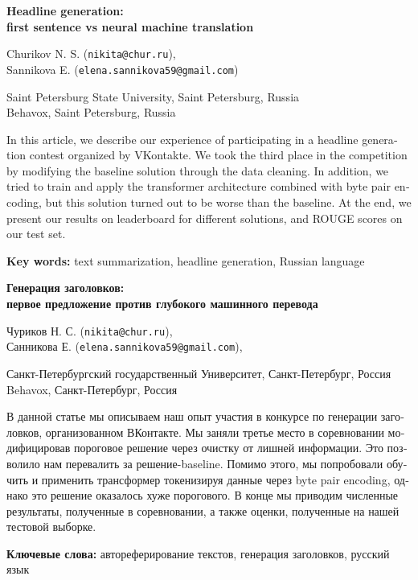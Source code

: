 \documentclass{dialogue}
\begin{document}
\begin{otherlanguage}{english}
\begin{center}
{\Large\bfseries{Headline generation:\\first sentence vs neural machine translation}}

\medskip

Churikov N. S. (\texttt{nikita@chur.ru}),\\Sannikova E. (\texttt{elena.sannikova59@gmail.com})

\medskip

Saint Petersburg State University, Saint Petersburg, Russia\\
Behavox, Saint Petersburg, Russia
\end{center}

In this article, we describe our experience of participating
in a headline generation contest organized by VKontakte. We took the third place
in the competition by modifying the baseline solution through the data cleaning.
In addition, we tried to train and apply the transformer architecture combined
with byte pair encoding, but this solution turned out to be worse than the baseline.
At the end, we present our results on leaderboard for different solutions, and ROUGE
scores on our test set.\medskip

\textbf{Key words:} text summarization, headline generation, Russian language
\end{otherlanguage}

\bigskip

\begin{otherlanguage}{russian}
\begin{center}
{\Large\bfseries{Генерация заголовков:\\первое предложение против глубокого машинного перевода}}

\medskip

Чуриков Н. С. (\texttt{nikita@chur.ru}),\\Санникова Е. (\texttt{elena.sannikova59@gmail.com}),

\medskip

Санкт-Петербургский государственный Университет, Санкт-Петербург, Россия\\
Behavox, Санкт-Петербург, Россия
\end{center}

В данной статье мы описываем наш опыт участия в конкурсе по генерации заголовков,
организованном ВКонтакте. Мы заняли третье место в соревновании модифицировав
пороговое решение через очистку от лишней информации. Это позволило нам перевалить
за решение-baseline. Помимо этого, мы попробовали обучить и применить трансформер
токенизируя данные через byte pair encoding, однако это решение оказалось хуже
порогового. В конце мы приводим численные результаты, полученные в соревновании,
а также оценки, полученные на нашей тестовой выборке.\medskip

\textbf{Ключевые слова:} автореферирование текстов, генерация заголовков, русский язык
\end{otherlanguage}
\end{document}
